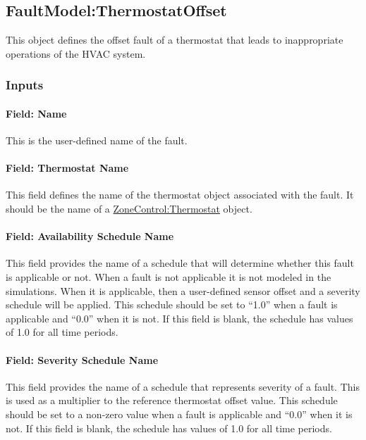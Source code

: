 \subsection{FaultModel:ThermostatOffset}\label{faultmodelthermostatoffset}

This object defines the offset fault of a thermostat that leads to inappropriate operations of the HVAC system.

\subsubsection{Inputs}\label{inputs-6-015}

\paragraph{Field: Name}\label{field-name-6-012}

This is the user-defined name of the fault.

\paragraph{Field: Thermostat Name}\label{field-thermostat-name}

This field defines the name of the thermostat object associated with the fault. It should be the name of a \hyperref[zonecontrolthermostat]{ZoneControl:Thermostat} object.

\paragraph{Field: Availability Schedule Name}\label{field-availability-schedule-name-6-002}

This field provides the name of a schedule that will determine whether this fault is applicable or not. When a fault is not applicable it is not modeled in the simulations. When it is applicable, then a user-defined sensor offset and a severity schedule will be applied. This schedule should be set to ``1.0'' when a fault is applicable and ``0.0'' when it is not. If this field is blank, the schedule has values of 1.0 for all time periods.

\paragraph{Field: Severity Schedule Name}\label{field-severity-schedule-name-6}

This field provides the name of a schedule that represents severity of a fault. This is used as a multiplier to the reference thermostat offset value. This schedule should be set to a non-zero value when a fault is applicable and ``0.0'' when it is not. If this field is blank, the schedule has values of 1.0 for all time periods.

